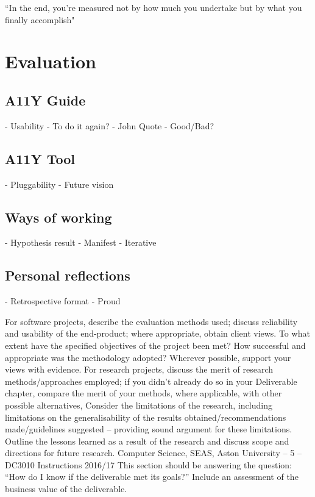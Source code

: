 \begin{savequote}[75mm]
``In the end, you're measured not by how much you undertake but by what you
finally accomplish"
\end{savequote}

\chapter{Evaluation}

\section{A11Y Guide}
- Usability
- To do it again?
- John Quote
- Good/Bad?

\section{A11Y Tool}
- Pluggability
- Future vision

\section{Ways of working}
- Hypothesis result
- Manifest
- Iterative

\section{Personal reflections}
- Retrospective format
- Proud


For software projects, describe the evaluation methods used; discuss reliability
and usability of the end-product; where appropriate, obtain client views. To
what extent have the specified objectives of the project been met? How
successful and appropriate was the methodology adopted? Wherever possible,
support your views with evidence.
For research projects, discuss the merit of research methods/approaches
employed; if you didn’t already do so in your Deliverable chapter, compare the
merit of your methods, where applicable, with other possible alternatives,
Consider the limitations of the research, including limitations on the
generalisability of the results obtained/recommendations made/guidelines
suggested – providing sound argument for these limitations. Outline the
lessons learned as a result of the research and discuss scope and directions for
future research.
Computer Science, SEAS, Aston University – 5 – DC3010 Instructions 2016/17
This section should be answering the question: “How do I know if the
deliverable met its goals?”
Include an assessment of the business value of the deliverable.

